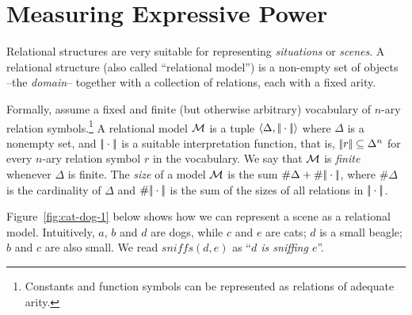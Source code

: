 \newcommand{\nDog}{\mathit{dog}\xspace}
\newcommand{\nCat}{\mathit{cat}\xspace}
\newcommand{\aSmall}{\mathit{small}\xspace}
\newcommand{\aSniffing}{\mathit{sniffs}\xspace}
\newcommand{\nBreed}{\mathit{beagle}\xspace}


\section{Measuring Expressive Power}\label{sec:technical}

Relational structures are very suitable for representing \emph{situations} or
\emph{scenes}.  A relational structure (also called ``relational model'') is a non-empty
set of objects --the \emph{domain}-- together with a collection of relations, each with a fixed arity.

Formally, assume a fixed and finite (but otherwise arbitrary)
vocabulary of $n$-ary relation symbols.\footnote{
  Constants and function symbols can be represented as relations of
  adequate arity.}
A relational model $\mathcal{M}$ is a tuple
$\langle \Delta,|\!|\cdot|\!|\rangle$ where $\Delta$ is a nonempty set, and
$|\!|\cdot|\!|$ is a suitable interpretation function, that is,
$|\!|r|\!| \subseteq \Delta^n$ for every $n$-ary relation symbol
$r$ in the vocabulary. We say that $\mathcal{M}$ is \emph{finite} whenever
$\Delta$ is finite.  The \emph{size} of a model $\mathcal{M}$ is the sum
$\#\Delta + \#|\!|\cdot|\!|$, where $\#\Delta$ is the cardinality
of $\Delta$ and $\#|\!|\cdot|\!|$ is the sum of the sizes of all
relations in $|\!|\cdot|\!|$.

Figure~\ref{fig:cat-dog-1} below shows how we can represent a scene
as a relational model. Intuitively, $a$, $b$ and $d$ are dogs, while
$c$ and $e$ are cats;  $d$ is a small beagle;
 $b$ and $c$ are also small.
 We read $\aSniffing(d,e)$ as ``{\em $d$ is sniffing $e$}''.

